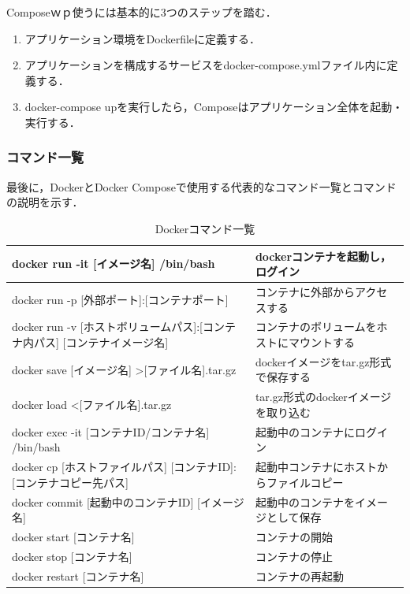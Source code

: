 Composeｗｐ使うには基本的に3つのステップを踏む．

\begin{enumerate}
    \item アプリケーション環境をDockerfileに定義する．
    \item アプリケーションを構成するサービスをdocker-compose.ymlファイル内に定義する．
    \item docker-compose upを実行したら，Composeはアプリケーション全体を起動・実行する．
\end{enumerate}

\subsubsection{コマンド一覧}
最後に，DockerとDocker Composeで使用する代表的なコマンド一覧とコマンドの説明を示す．


\begin{table}[htb]
    \begin{center}
        \caption{Dockerコマンド一覧}
        \begin{tabularx}{\textwidth}{|l|X|}\hline
            docker run -it [イメージ名] /bin/bash & dockerコンテナを起動し，ログイン \\ \hline
            docker run -p [外部ポート]:[コンテナポート] & コンテナに外部からアクセスする \\ \hline
            docker run -v [ホストボリュームパス]:[コンテナ内パス] [コンテナイメージ名] & コンテナのボリュームをホストにマウントする \\ \hline
            docker save [イメージ名] \textgreater [ファイル名].tar.gz & dockerイメージをtar.gz形式で保存する\\ \hline
            docker load \textless [ファイル名].tar.gz & tar.gz形式のdockerイメージを取り込む \\ \hline
            docker exec -it [コンテナID/コンテナ名] /bin/bash & 起動中のコンテナにログイン \\ \hline
            docker cp [ホストファイルパス] [コンテナID]:[コンテナコピー先パス] & 起動中コンテナにホストからファイルコピー \\ \hline
            docker commit [起動中のコンテナID] [イメージ名] & 起動中のコンテナをイメージとして保存 \\ \hline
            docker start [コンテナ名] & コンテナの開始 \\ \hline
            docker stop [コンテナ名] & コンテナの停止 \\ \hline
            docker restart [コンテナ名] & コンテナの再起動 \\ \hline
        \end{tabularx}
        \label{docker_command}
    \end{center}
\end{table}


